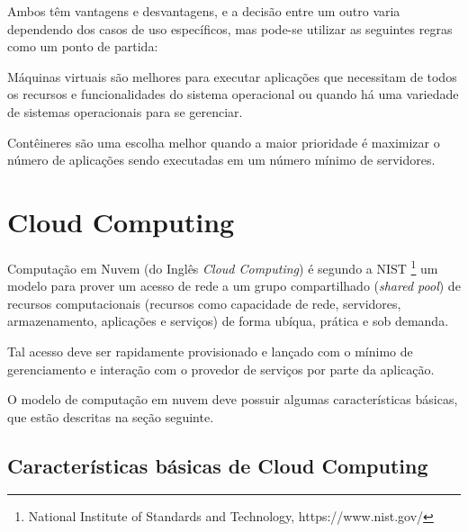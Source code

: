 	Ambos têm vantagens e desvantagens, e a decisão entre um outro varia dependendo dos casos de uso específicos, mas pode-se utilizar as seguintes regras como um ponto de partida:
	
	Máquinas virtuais são melhores para executar aplicações que necessitam de todos os recursos e funcionalidades do sistema operacional ou quando há uma variedade de sistemas operacionais para se gerenciar.
	
	Contêineres são uma escolha melhor quando a maior prioridade é maximizar o número de aplicações sendo executadas em um número mínimo de servidores.
	
	\section{Cloud Computing}
	Computação em Nuvem (do Inglês \textit{Cloud Computing}) é segundo a NIST \footnote{National Institute of Standards and Technology, https://www.nist.gov/} um modelo para prover um acesso de rede a um grupo compartilhado (\textit{shared pool}) de recursos computacionais (recursos como capacidade de rede, servidores, armazenamento, aplicações e serviços) de forma ubíqua, prática e sob demanda.

    Tal acesso deve ser rapidamente provisionado e lançado com o mínimo de gerenciamento e interação com o provedor de serviços por parte da aplicação.

    O modelo de computação em nuvem deve possuir algumas características básicas, que estão descritas na seção seguinte.

        \subsection{Características básicas de Cloud Computing}

